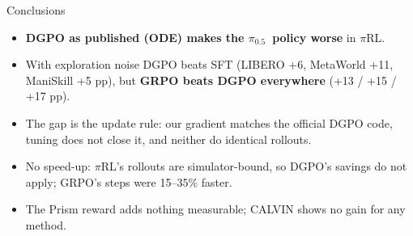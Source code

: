 \documentclass[aspectratio=169,11pt]{beamer}
\newcommand{\pirl}{$\pi$RL}
\newcommand{\pifive}{$\pi_{0.5}$}
\begin{document}
\begin{frame}{Conclusions}
  \begin{itemize}
    \item \textbf{DGPO as published (ODE) makes the \pifive\ policy worse} in \pirl.
    \item With exploration noise DGPO beats SFT (LIBERO +6, MetaWorld +11, ManiSkill +5 pp),
          but \textbf{GRPO beats DGPO everywhere} (+13 / +15 / +17 pp).
    \item The gap is the update rule: our gradient matches the official DGPO code, tuning does not
          close it, and neither do identical rollouts.
    \item No speed-up: \pirl's rollouts are simulator-bound, so DGPO's savings do not apply;
          GRPO's steps were 15--35\% faster.
    \item The Prism reward adds nothing measurable; CALVIN shows no gain for any method.
  \end{itemize}
\end{frame}
\end{document}
